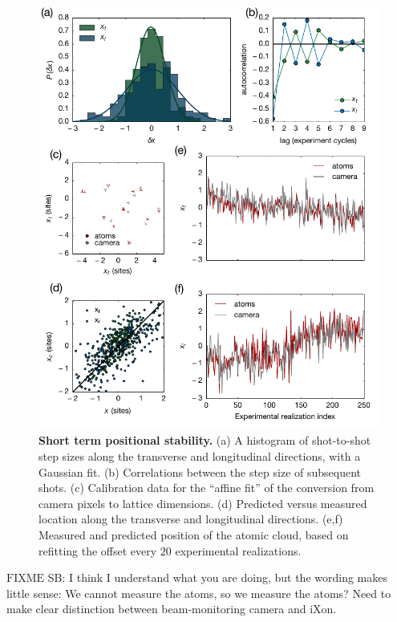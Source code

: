 \documentclass[twocolumn,aps,pra,showpacs,preprintnumbers,bibnotes]{revtex4-1}
\newcommand\FIXME{{\color{red}\ensuremath{\mathrm{FIXME}}}}
\begin{document}
\begin{figure}
  \begin{center}
    \includegraphics[width=\columnwidth]{Figure13.pdf}
    \caption{\textbf{Short term positional stability.} (a) A histogram of shot-to-shot step sizes along the transverse and longitudinal directions, with a Gaussian fit. (b) Correlations between the step size of subsequent shots. (c) Calibration data for the ``affine fit'' of the conversion from camera pixels to lattice dimensions. (d) Predicted versus measured location along the transverse and longitudinal directions. (e,f) Measured  and predicted position of the atomic cloud, based on refitting the offset every $20$ experimental realizations.}\label{fig:stability}
  \end{center}
\end{figure}

\FIXME{} SB: I think I understand what you are doing, but the wording makes little sense: We cannot measure the atoms, so we measure the atoms? Need to make clear distinction between beam-monitoring camera and iXon.
\end{document}

